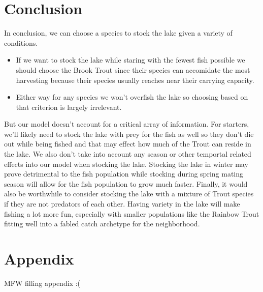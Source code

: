 \documentclass[letterpaper,12pt]{article}
\begin{document}
\section{Conclusion}
In conclusion, we can choose a species to stock the lake given a variety of conditions.
\begin{itemize}
    \item If we want to stock the lake while staring with the fewest fish possible we should choose the Brook Trout since their species can accomidate the most harvesting because their species usually reaches near their carrying capacity.
    \item Either way for any species we won't overfish the lake so choosing based on that criterion is largely irrelevant.
\end{itemize}
But our model doesn't account for a critical array of information. 
For starters, we'll likely need to stock the lake with prey for the fish as well so they don't die out while being fished and that may effect how much of the Trout can reside in the lake.
We also don't take into account any season or other temportal related effects into our model when stocking the lake.
Stocking the lake in winter may prove detrimental to the fish population while stocking during spring mating season will allow for the fish population to grow much faster.
Finally, it would also be worthwhile to consider stocking the lake with a mixture of Trout species if they are not predators of each other.
Having variety in the lake will make fishing a lot more fun, especially with smaller populations like the Rainbow Trout fitting well into a fabled catch archetype for the neighborhood.
\section{Appendix}
MFW filling appendix :(
\end{document}
